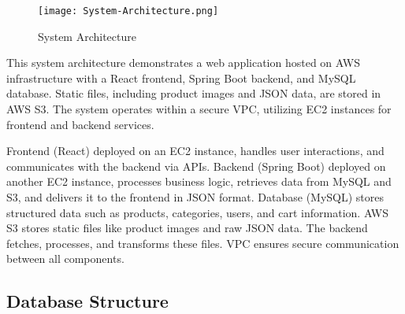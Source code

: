 \documentclass[conference]{IEEEtran}
\begin{document}
\begin{figure}[H]
    \centering
    \texttt{[image: System-Architecture.png]}
    \caption{System Architecture}
    \label{fig:system-architecture}
\end{figure}

This system architecture demonstrates a web application hosted on AWS infrastructure with a React frontend, Spring Boot backend, and MySQL database. Static files, including product images and JSON data, are stored in AWS S3. The system operates within a secure VPC, utilizing EC2 instances for frontend and backend services.\newline

Frontend (React) deployed on an EC2 instance, handles user interactions, and communicates with the backend via APIs.\newline\hspace*{2.5ex}
Backend (Spring Boot) deployed on another EC2 instance, processes business logic, retrieves data from MySQL and S3, and delivers it to the frontend in JSON format.\newline\hspace*{2.5ex}
Database (MySQL) stores structured data such as products, categories, users, and cart information.
AWS S3 stores static files like product images and raw JSON data. The backend fetches, processes, and transforms these files.\newline\hspace*{2.5ex}
VPC ensures secure communication between all components.

\vspace{3cm}
\subsection{Database Structure}
\vspace{0.2cm}
\end{document}

